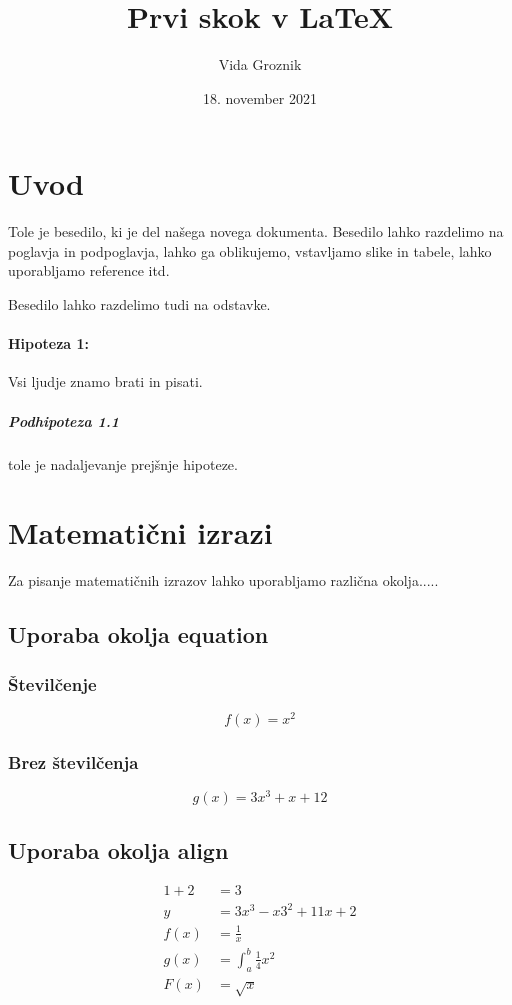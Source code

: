 \documentclass{article}
\title{Prvi skok v LaTeX}
\author{Vida Groznik}
\date{18. november 2021}
\begin{document}
\maketitle
\newpage

\tableofcontents
\listoftables
\listoffigures

\newpage

\section{Uvod}
Tole je besedilo, ki je del našega novega dokumenta. Besedilo lahko razdelimo na poglavja in podpoglavja, lahko ga oblikujemo, vstavljamo slike in tabele, lahko uporabljamo reference itd.

Besedilo lahko razdelimo tudi na odstavke.

\paragraph{Hipoteza 1:} Vsi ljudje znamo brati in pisati. 

\subparagraph{Podhipoteza 1.1} tole je nadaljevanje prejšnje hipoteze.

\section{Matematični izrazi}
Za pisanje matematičnih izrazov lahko uporabljamo različna okolja.....
\subsection{Uporaba okolja equation}
\subsubsection{Številčenje}
\begin{equation}
    f(x) = x^2
\end{equation}

\subsubsection{Brez številčenja}
\begin{equation*}
    g(x) = 3x^3 + x + 12
\end{equation*}

\subsection{Uporaba okolja align}
\begin{align*}
    1 + 2 &= 3 \\
    y &= 3x^3 - x3^2 +11x + 2 \\
    f(x) &= \frac{1}{x} \\
    g(x) &= \int^b_a \frac{1}{4}x^2 \\
    F(x) &= \sqrt{x}
\end{align*}
\end{document}
